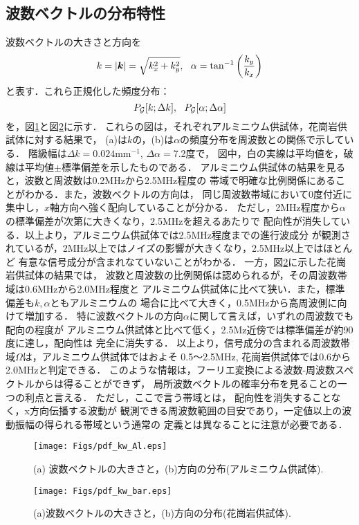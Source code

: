 \subsection{波数ベクトルの分布特性}
波数ベクトルの大きさと方向を
\begin{equation}
	k=\left| \fat{k} \right|=\sqrt{k_x^2+k_y^2},  \ \ 
	\alpha = \tan^{-1} \left( \frac{k_y}{k_x} \right)
	\label{eqn:kpol}
\end{equation}
と表す．これら正規化した頻度分布：
\[
	P_{\cal G}[k;\Delta k], \ \ 
	P_{\cal G}[\alpha;\Delta \alpha]
\]
を，図\ref{fig:fig8}と図\ref{fig:fig9}に示す．
これらの図は，それぞれアルミニウム供試体，花崗岩供試体に対する結果で，
(a)は$k$の，(b)は$\alpha$の頻度分布を周波数との関係で示している．
階級幅は$\Delta k=0.024$mm$^{-1}$, $\Delta \alpha=$7.2度で，
図中，白の実線は平均値を，破線は平均値$\pm$標準偏差を示したものである．
アルミニウム供試体の結果を見ると，波数と周波数は0.2MHzから2.5MHz程度の
帯域で明確な比例関係にあることがわかる．また，波数ベクトルの方向は，
同じ周波数帯域において0度付近に集中し，$x$軸方向へ強く配向していることが分かる．
ただし，2MHz程度から$\alpha$の標準偏差が次第に大きくなり，2.5MHzを超えるあたりで
配向性が消失している．以上より，アルミニウム供試体では2.5MHz程度までの進行波成分
が観測されているが，2MHz以上ではノイズの影響が大きくなり，2.5MHz以上ではほとんど
有意な信号成分が含まれなていないことがわかる．
一方，図\ref{fig:fig9}に示した花崗岩供試体の結果では，
波数と周波数の比例関係は認められるが，その周波数帯域は0.6MHzから2.0MHz程度と
アルミニウム供試体に比べて狭い．また，標準偏差も$k,\alpha$ともアルミニウムの
場合に比べて大きく，0.5MHzから高周波側に向けて増加する．
特に波数ベクトルの方向$\alpha$に関して言えば，いずれの周波数でも配向の程度が
アルミニウム供試体と比べて低く，2.5Mz近傍では標準偏差が約90度に達し，配向性は
完全に消失する．
以上より，信号成分の含まれる周波数帯域$\Omega$は，アルミニウム供試体ではおよそ
0.5〜2.5MHz, 花崗岩供試体では0.6から2.0MHzと判定できる．
このような情報は，フーリエ変換による波数-周波数スペクトルからは得ることができず，
局所波数ベクトルの確率分布を見ることの一つの利点と言える．
ただし，ここで言う帯域とは， 配向性を消失することなく，x方向伝播する波動が
観測できる周波数範囲の目安であり，一定値以上の波動振幅の得られる帯域という通常の
定義とは異なることに注意が必要である．
\begin{figure}
\begin{center}
	\texttt{[image: Figs/pdf\_kw\_Al.eps]}
	\caption{(a) 波数ベクトルの大きさと，(b)方向の分布(アルミニウム供試体).}
	\label{fig:fig8}
\end{center}
\end{figure}
\begin{figure}
\begin{center}
	\texttt{[image: Figs/pdf\_kw\_bar.eps]}
	\caption{(a)波数ベクトルの大きさと，(b)方向の分布(花崗岩供試体).}
	\label{fig:fig9}
\end{center}
\end{figure}
